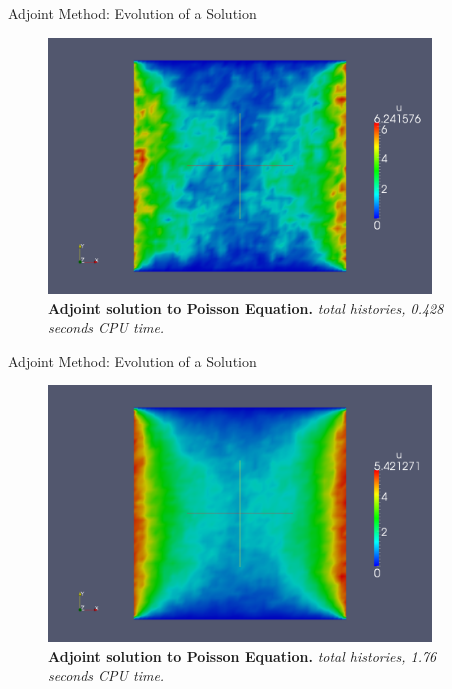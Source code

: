 \documentclass{beamer}
\begin{document}
\begin{frame}{Adjoint Method: Evolution of a Solution}

  \begin{figure}[h!]
    \begin{center}
      \includegraphics[width=4in]{adjoint_10000.png}
    \end{center}
    \caption{\textbf{Adjoint solution to Poisson Equation.}
      \textit{ total histories, 0.428 seconds CPU time.} }
  \end{figure}

\end{frame}

\begin{frame}{Adjoint Method: Evolution of a Solution}

  \begin{figure}[h!]
    \begin{center}
      \includegraphics[width=4in]{adjoint_100000.png}
    \end{center}
    \caption{\textbf{Adjoint solution to Poisson Equation.}
      \textit{ total histories, 1.76 seconds CPU time.} }
  \end{figure}

\end{frame}
\end{document}
